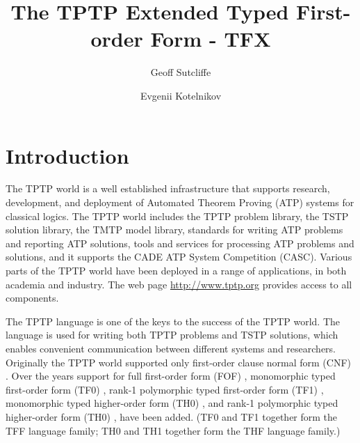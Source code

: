 \documentclass{easychair}
\begin{document}
\title{The TPTP Extended Typed First-order Form - TFX}
\author{
    Geoff Sutcliffe
\and
    Evgenii Kotelnikov
}
\clearpage
\maketitle

\begin{abstract}
\end{abstract}

\section{Introduction}
\label{Introduction}

The TPTP world \cite{Sut10} is a well established infrastructure that supports
research, development, and deployment of Automated Theorem Proving (ATP)
systems for classical logics.
The TPTP world includes the TPTP problem library,
the TSTP solution library,
the TMTP model library,
standards for writing ATP problems and reporting ATP solutions,
tools and services for processing ATP problems and solutions,
and it supports the CADE ATP System Competition (CASC).
Various parts of the TPTP world have been deployed in a range of applications,
in both academia and industry.
The web page \url{http://www.tptp.org} provides access to all components.

The TPTP language is one of the keys to the success of the TPTP world.
The language is used for writing both TPTP problems and TSTP solutions,
which enables convenient communication between different systems and
researchers.
Originally the TPTP world supported only first-order clause normal form (CNF)
\cite{SS98-JAR}.
Over the years support for full first-order form (FOF) \cite{Sut09},
monomorphic typed first-order form (TF0) \cite{SS+12}, rank-1 polymorphic
typed first-order form (TF1) \cite{BP13-TFF1}, monomorphic typed higher-order 
form (TH0) \cite{SB10}, and rank-1 polymorphic typed higher-order form (TH0) 
\cite{KSR16}, have been added.
(TF0 and TF1 together form the TFF language family; TH0 and TH1 together form 
the THF language family.)
\end{document}
